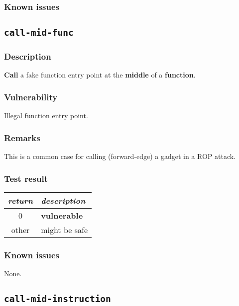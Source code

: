 \documentclass[a4paper]{book}
\begin{document}
\subsubsection{Known issues}

\newpage


\subsection{\texttt{call-mid-func}}\label{test-call-mid-func}

\subsubsection{Description}
\textbf{Call} a fake function entry point at the \textbf{middle} of a \textbf{function}.

\subsubsection{Vulnerability}
Illegal function entry point.

\subsubsection{Remarks}
This is a common case for calling (forward-edge) a gadget in a ROP attack.

\subsubsection{Test result}
\begin{tabular}{cl}
  \toprule
  \emph{return}  & \emph{description} \\
  \midrule
  0              & \textbf{vulnerable} \\
  other          & might be safe \\
  \bottomrule
\end{tabular}
  
\subsubsection{Known issues}

None.

\newpage
\subsection{\texttt{call-mid-instruction}}\label{test-call-mid-instruction}
\end{document}
